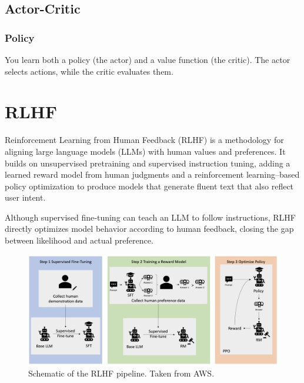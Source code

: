 \documentclass{article}
\begin{document}
\subsection{Actor-Critic}

\subsubsection{Policy} You learn both a policy (the actor) and a value function (the critic). The actor selects actions, while the critic evaluates them.

\clearpage\newpage
\section{RLHF}

Reinforcement Learning from Human Feedback (RLHF) is a methodology for aligning large language models (LLMs) with human values and preferences. It builds on unsupervised pretraining and supervised instruction tuning, adding a learned reward model from human judgments and a reinforcement learning–based policy optimization to produce models that generate fluent text that also reflect user intent.

Although supervised fine‑tuning can teach an LLM to follow instructions, RLHF directly optimizes model behavior according to human feedback, closing the gap between likelihood and actual preference.

\begin{figure}[ht]
    \centering
    \includegraphics[width=0.95\linewidth]{graphics/S11RLHF/rlhf.jpg}
    \caption{Schematic of the RLHF pipeline. Taken from AWS.}
    \label{fig:rlhf-pipeline}
\end{figure}
\end{document}

